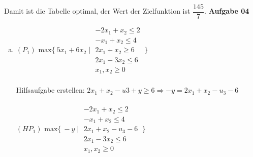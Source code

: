 \documentclass[a4paper,10pt]{article}
\begin{document}
	Damit ist die Tabelle optimal, der Wert der Zielfunktion ist $\dfrac{145}{7}$.
	\newpage
	\textbf{Aufgabe 04}\\
	\begin{enumerate}[a)]
		\item 
		$ (P_1) \text{ max} \{\ 5x_1 + 6x_2 \mid \begin{matrix}
		-2x_1 + x_2 \leq 2\\
		-x_1 + x_2 \leq 4\\
		2x_1 + x_2 \geq 6\\
		2x_1 - 3x_2 \leq 6\\
		x_1, x_2 \geq 0
		\end{matrix}
		\ \} $\\\\
		Hilfsaufgabe erstellen: $2x_1 + x_2 -u3 + y \geq 6 \Rightarrow -y = 2x_1 + x_2 -u_3 - 6$\\\\
		$ (HP_1) \text{ max} \{\ -y \mid \begin{matrix}
		-2x_1 + x_2 \leq 2\\
		-x_1 + x_2 \leq 4\\
		2x_1 + x_2 -u_3 - 6\\
		2x_1 - 3x_2 \leq 6\\
		x_1, x_2 \geq 0
		\end{matrix}
		\ \} $
		

\end{enumerate}
\end{document}
